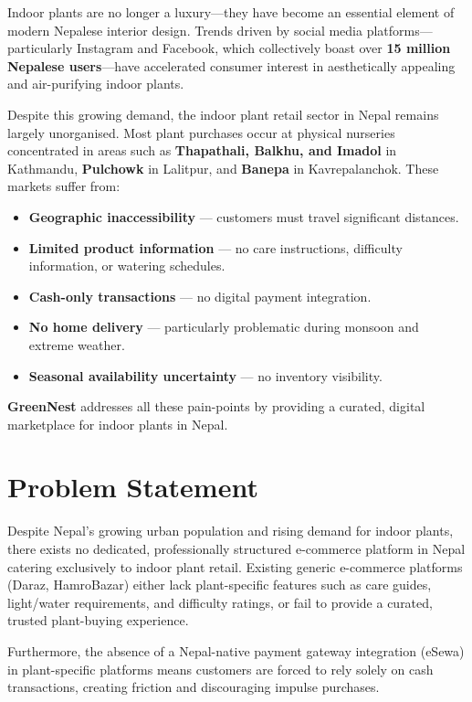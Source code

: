\documentclass[12pt,a4paper]{report}
\begin{document}
Indoor plants are no longer a luxury—they have become an essential element of modern Nepalese interior design. Trends driven by social media platforms—particularly Instagram and Facebook, which collectively boast over \textbf{15 million Nepalese users}—have accelerated consumer interest in aesthetically appealing and air-purifying indoor plants.

Despite this growing demand, the indoor plant retail sector in Nepal remains largely unorganised. Most plant purchases occur at physical nurseries concentrated in areas such as \textbf{Thapathali, Balkhu, and Imadol} in Kathmandu, \textbf{Pulchowk} in Lalitpur, and \textbf{Banepa} in Kavrepalanchok. These markets suffer from:

\begin{itemize}
  \item \textbf{Geographic inaccessibility} — customers must travel significant distances.
  \item \textbf{Limited product information} — no care instructions, difficulty information, or watering schedules.
  \item \textbf{Cash-only transactions} — no digital payment integration.
  \item \textbf{No home delivery} — particularly problematic during monsoon and extreme weather.
  \item \textbf{Seasonal availability uncertainty} — no inventory visibility.
\end{itemize}

\textbf{GreenNest} addresses all these pain-points by providing a curated, digital marketplace for indoor plants in Nepal.

\section{Problem Statement}

Despite Nepal's growing urban population and rising demand for indoor plants, there exists no dedicated, professionally structured e-commerce platform in Nepal catering exclusively to indoor plant retail. Existing generic e-commerce platforms (Daraz, HamroBazar) either lack plant-specific features such as care guides, light/water requirements, and difficulty ratings, or fail to provide a curated, trusted plant-buying experience.

Furthermore, the absence of a Nepal-native payment gateway integration (eSewa) in plant-specific platforms means customers are forced to rely solely on cash transactions, creating friction and discouraging impulse purchases.
\end{document}
